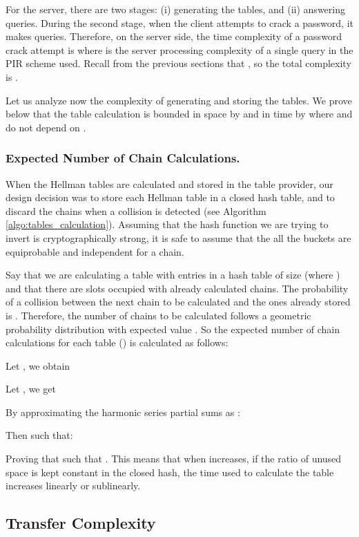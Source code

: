 \documentclass{llncs}
\begin{document}
For the server, there are two stages: (i) generating the tables, and
(ii) answering queries.
During the second stage, when the client attempts to crack a password, 
it makes  queries.
Therefore, on the server side, the time complexity of a password crack attempt 
is 
where  is the server processing complexity of a single query in
the PIR scheme used. Recall from the previous sections
that , so the total complexity is .

Let us analyze now the complexity of generating and storing the tables.
We prove below that the table calculation is bounded in space by  
and in time by  where  and  do not depend on
. 


\subsubsection{Expected Number of Chain Calculations.
\label{sub:number-of-chains-calculation}}

When the Hellman tables are calculated and stored in the table provider,
our design decision was to store each Hellman table in a closed hash table,
and to discard the chains when a collision is detected
(see Algorithm \ref{algo:tables_calculation}).
Assuming that the hash function we are trying to invert is cryptographically
strong, it is safe to assume that the all the buckets are equiprobable
and independent for a chain.

Say that we are calculating a table with  entries in a hash
table of size  (where ) and that there are 
slots occupied with already calculated chains. The probability of
a collision between the next chain to be calculated and the ones already
stored is . Therefore, the number of chains to be
calculated follows a geometric probability distribution with expected
value . So the expected number of chain calculations
for each table () is calculated as follows:

Let , we obtain

Let , we get

By approximating the harmonic series partial sums as :

Then  such that:

Proving that  
such that . 
This means that when  increases, if the ratio of unused space
is kept constant in the closed hash, the time used to calculate the
table increases linearly or sublinearly.



\subsection{Transfer Complexity}
\end{document}
